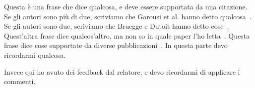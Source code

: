 Questa è una frase che dice qualcosa, e deve essere supportata da una citazione.
Se gli autori sono più di due, scriviamo che Garousi et al. hanno detto qualcosa~\cite{garousi2019_mlr_guidelines}.
Se gli autori sono due, scriviamo che Bruegge e Dutoit hanno detto cose~\cite{bruegge2009object_se}.
Quest'altra frase dice qualcos'altro, ma non so in quale paper l'ho letta~\needcite.
Questa frase dice cose supportate da diverse pubblicazioni~\cite{casillo2022detecting,destefano2020splicing,giordano2022slr,iannone2022secret,lambiase2022fences,sellitto2022refactoring,pontillo2022static}.
In questa parte devo ricordarmi qualcosa.


Invece qui ho avuto dei feedback dal relatore, e devo ricordarmi di applicare i commenti. 






